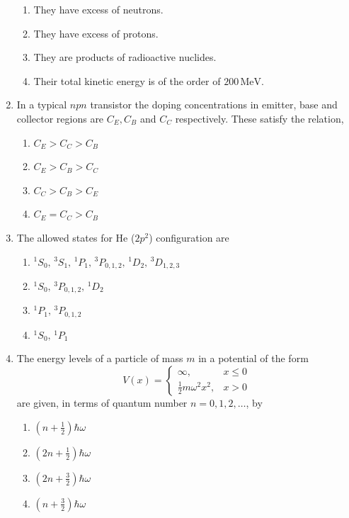 \documentclass[journal,12pt,onecolumn]{IEEEtran}
\begin{document}
\begin{enumerate}[itemsep = 1em]
\begin{enumerate}
    \item They have excess of neutrons.
    \item They have excess of protons.
    \item They are products of radioactive nuclides.
    \item Their total kinetic energy is of the order of $200\,\mathrm{MeV}$.
\end{enumerate}


\item In a typical $npn$ transistor the doping concentrations in emitter, base and collector regions are $C_E, C_B$ and $C_C$ respectively. These satisfy the relation,

\hfill{}

\begin{enumerate}
    \item $C_E > C_C > C_B$
    \item $C_E > C_B > C_C$
    \item $C_C > C_B > C_E$
    \item $C_E = C_C > C_B$
\end{enumerate}


\item The allowed states for He ($2p^2$) configuration are

\hfill{}

\begin{enumerate}
    \item $^1S_0,\, ^3S_1,\, ^1P_1,\, ^3P_{0,1,2},\, ^1D_2,\, ^3D_{1,2,3}$
    \item $^1S_0,\, ^3P_{0,1,2},\, ^1D_2$
    \item $^1P_1,\, ^3P_{0,1,2}$
    \item $^1S_0,\, ^1P_1$
\end{enumerate}


\item The energy levels of a particle of mass $m$ in a potential of the form
\[
V(x) = 
\begin{cases}
\infty, & x \leq 0 \\
\frac{1}{2}m\omega^2 x^2, & x > 0
\end{cases}
\]
are given, in terms of quantum number $n = 0,1,2,\dots$, by

\hfill{}

\begin{enumerate}
    \item $\left(n + \frac{1}{2}\right)\hbar\omega$
    \item $\left(2n + \frac{1}{2}\right)\hbar\omega$
    \item $\left(2n + \frac{3}{2}\right)\hbar\omega$
    \item $\left(n + \frac{3}{2}\right)\hbar\omega$
\end{enumerate}



\end{enumerate}
\end{document}
